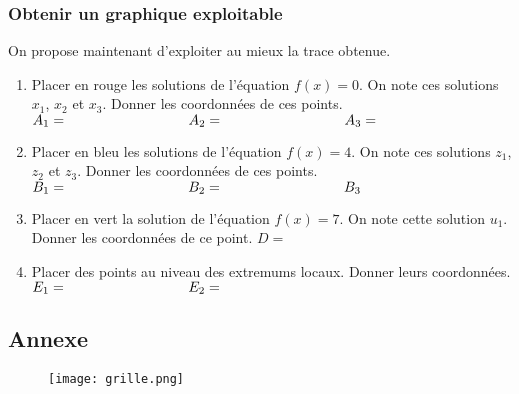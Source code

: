 \documentclass[paper=a4, fontsize=9pt]{scrartcl} %
\begin{document}
\subsubsection*{Obtenir un graphique exploitable}

On propose maintenant d'exploiter au mieux la trace obtenue.

\begin{enumerate}
\item Placer en rouge les solutions de l'équation $f(x) = 0$. On note ces solutions $x_1$, $x_2$ et $x_3$. Donner les coordonnées de ces points. $A_1 = \text{\phantom{azertyuipazertyuiop}} A_2 = \text{\phantom{azertyuipazertyuiop}} A_3 =$
\item Placer en bleu les solutions de l'équation $f(x) = 4$. On note ces solutions $z_1$, $z_2$ et $z_3$. Donner les coordonnées de ces points. $B_1 = \text{\phantom{azertyuipazertyuiop}} B_2 = \text{\phantom{azertyuipazertyuiop}} B_3$
\item Placer en vert la solution de l'équation $f(x) = 7$. On note cette solution $u_1$. Donner les coordonnées de ce point. $D =$ 
\item Placer des points au niveau des extremums locaux. Donner leurs coordonnées. $E_1 = \text{\phantom{azertyuipazertyuiop}} E_2 = $
 
\end{enumerate}


\subsection*{Annexe}

\begin{figure}[H]
  \centering
  \texttt{[image: grille.png]}
\end{figure}
\end{document}
